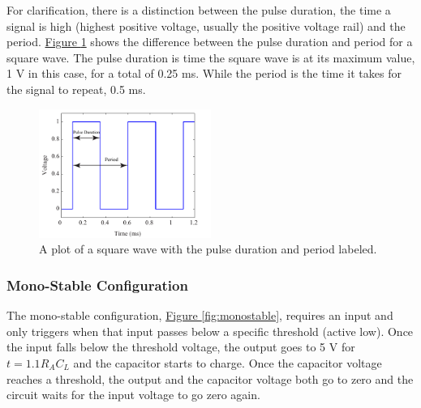 For clarification, there is a distinction between the pulse duration, the time a signal is high (highest positive voltage, usually the positive voltage rail) and the period. \hyperref[fig:7durvsper]{Figure \ref*{fig:7durvsper}} shows the difference between the pulse duration and period for a square wave. The pulse duration is time the square wave is at its maximum value, 1 V in this case, for a total of 0.25 ms. While the period is the time it takes for the signal to repeat, 0.5 ms. 

\begin{figure}
	\centering
		\includegraphics[width=0.5\textwidth]{lab7durvsper.pdf}
	\caption{A plot of a square wave with the pulse duration and period labeled.} \label{fig:7durvsper}
\end{figure}

\newpage

\subsubsection{Mono-Stable Configuration}

The mono-stable configuration, \hyperref[fig:monostable]{Figure \ref*{fig:monostable}}, requires an input and only triggers when that input passes below a specific threshold (active low). Once the input falls below the threshold voltage, the output goes to 5 V for $t=  1.1 R_A C_L$ and the capacitor starts to charge. Once the capacitor voltage reaches a threshold, the output and the capacitor voltage both go to zero and the circuit waits for the input voltage to go zero again. 

